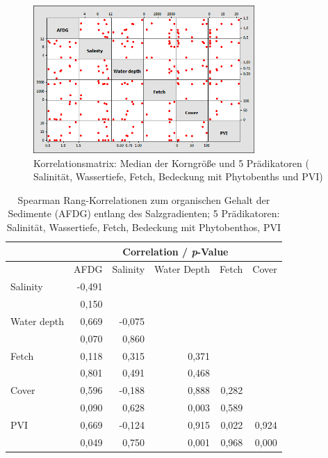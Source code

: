 \begin{figure}[!htb]
\centering
\includegraphics[width=0.75\textwidth]{images/matrixplot/afdg_matrixplot.png}
\caption[Korrelationsmatrix: Organischer Gehalt der Sedimente und 5 Prädikatoren]{Korrelationsmatrix: Median der Korngröße und 5 Prädikatoren ( Salinität, Wassertiefe, Fetch, Bedeckung mit Phytobenths und PVI)}
\label{fig:sg:afdg_matrixplot}
\end{figure}



\begin{table}[!htb]
\centering
\caption[Spearman Rang-Korrelationen zum organischen Gehalt der Sedimente]{Spearman Rang-Korrelationen zum organischen Gehalt der Sedimente (AFDG) entlang des Salzgradienten; 5 Prädikatoren: Salinität, Wassertiefe, Fetch, Bedeckung mit Phytobenthos, PVI}
\begin{tabular}{lrrrrr}

\toprule
& \multicolumn{5}{c}{Correlation / \textit{p}-Value} \\
\midrule
& \multicolumn{1}{c}{AFDG}  & \multicolumn{1}{c}{Salinity} & \multicolumn{1}{c}{Water Depth} & \multicolumn{1}{c}{Fetch} & \multicolumn{1}{c}{Cover} \\

\midrule

Salinity        &       -0,491\\
                &       0,150\\
\midrule
Water depth	    &     	0,669  			&-0,075\\
        		&		0,070   		&0,860\\
\midrule
Fetch  	        &   	0,118   		&0,315			   &0,371\\
        		&		0,801  			&0,491   			&0,468 \\
\midrule
Cover  	        &     	0,596  			&-0,188   			&0,888   		&0,282\\
        		&		0,090   		&0,628   			&0,003   		&0,589\\
\midrule
PVI	            &     	0,669  			&-0,124   			&0,915   		&0,022  	& 0,924\\
        		&		0,049   		&0,750   			&0,001   		&0,968   	&0,000\\
\bottomrule

\end{tabular}
\label{tab:spearman_rank_correlations_afdg}
\end{table}




